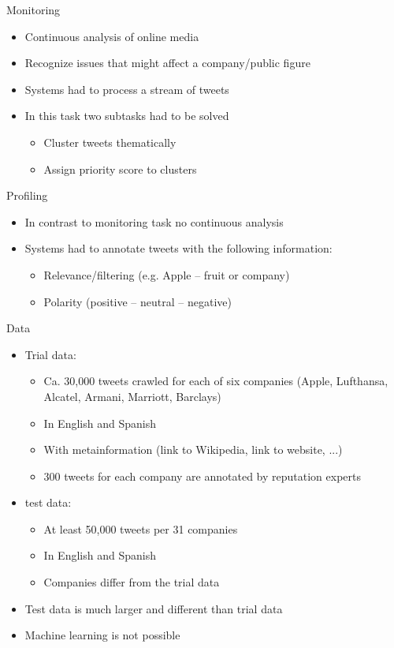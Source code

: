 \documentclass[12pt,a4paper]{beamer}
\begin{document}
\begin{frame}{Monitoring}
\begin{itemize}
\item Continuous analysis of online media
\item Recognize issues that might affect a company/public figure
\item Systems had to process a stream of tweets
\item In this task two subtasks had to be solved
\begin{itemize}
\item Cluster tweets thematically
\item Assign priority score to clusters
\end{itemize}
\end{itemize}
\end{frame}

\begin{frame}{Profiling}
\begin{itemize}
\item In contrast to monitoring task no continuous analysis
\item Systems had to annotate tweets with the following information:
\begin{itemize}
\item Relevance/filtering (e.g. Apple -- fruit or company)
\item Polarity (positive -- neutral -- negative)
\end{itemize}
\end{itemize}
\end{frame}

\begin{frame}{Data}
\begin{itemize}
\item Trial data:
\begin{itemize}
\item Ca. 30,000 tweets crawled for each of six companies (Apple, Lufthansa, Alcatel, Armani, Marriott, Barclays)
\item In English and Spanish
\item With metainformation (link to Wikipedia, link to website, ...)
\item 300 tweets for each company are annotated by reputation experts
\end{itemize}
\item test data:
\begin{itemize}
\item At least 50,000 tweets per 31 companies
\item In English and Spanish
\item Companies differ from the trial data
\end{itemize}
\item Test data is much larger and different than trial data
\item Machine learning is not possible
\end{itemize}
\end{frame}
\end{document}

